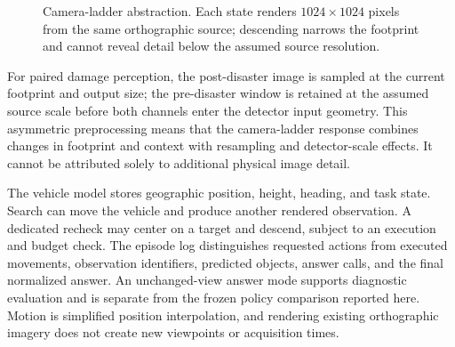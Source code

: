 \begin{figure}[htbp]
\centering
\resizebox{\linewidth}{!}{}
\caption{Camera-ladder abstraction. Each state renders $1024\times1024$ pixels from the same orthographic source; descending narrows the footprint and cannot reveal detail below the assumed source resolution.}
\label{fig:ladder}
\end{figure}

For paired damage perception, the post-disaster image is sampled at the current footprint and output size; the pre-disaster window is retained at the assumed source scale before both channels enter the detector input geometry. This asymmetric preprocessing means that the camera-ladder response combines changes in footprint and context with resampling and detector-scale effects. It cannot be attributed solely to additional physical image detail.

The vehicle model stores geographic position, height, heading, and task state. Search can move the vehicle and produce another rendered observation. A dedicated recheck may center on a target and descend, subject to an execution and budget check. The episode log distinguishes requested actions from executed movements, observation identifiers, predicted objects, answer calls, and the final normalized answer. An unchanged-view answer mode supports diagnostic evaluation and is separate from the frozen policy comparison reported here. Motion is simplified position interpolation, and rendering existing orthographic imagery does not create new viewpoints or acquisition times.
